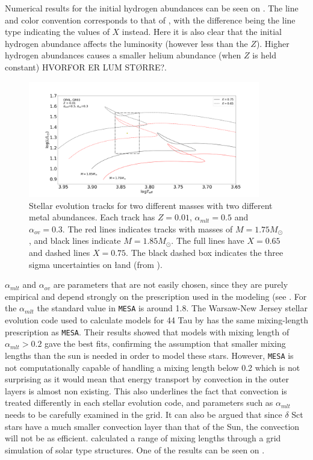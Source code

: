 Numerical results for the initial hydrogen abundances can be seen on . The line and color convention corresponds to that of , with the difference being the line type indicating the values of $X$ instead. Here it is also clear that the initial hydrogen abundance affects the luminosity (however less than the $Z$). Higher hydrogen abundances causes a smaller helium abundance (when $Z$ is held constant) HVORFOR ER LUM STØRRE?. 

\begin{figure}[htbp]
	\centering
	\includegraphics[width=0.9\textwidth]{test_x.png}
	\caption{Stellar evolution tracks for two different masses with two different metal abundances. Each track has $Z=0.01$, $\alpha_{mlt}=0.5$ and $\alpha_{ov}=0.3$. The red lines indicates tracks with masses of $M=1.75M_\odot$, and black lines indicate $M=1.85M_\odot$. The full lines have $X = 0.65$ and dashed lines $X = 0.75$. The black dashed box indicates the three sigma uncertainties on \l and \teff (from \citet{lenz2010delta}).}
	\label{diffx}
\end{figure}

 $\alpha_{mlt}$ and $\alpha_{ov}$ are parameters that are not easily chosen, since they are purely empirical and depend strongly on the prescription used in the modeling (see . For the $\alpha_{mlt}$ the standard value in \texttt{MESA} is around 1.8. The Warsaw-New Jersey stellar evolution code used to calculate models for 44 Tau by \citep{lenz2010delta} has the same mixing-length prescription as \texttt{MESA}. Their results showed that models with mixing length of $\alpha_{mlt} > 0.2$ gave the best fits, confirming the assumption that smaller mixing lengths than the sun is needed in order to model these stars. However, \texttt{MESA} is not computationally capable of handling a mixing length below 0.2 which is not surprising as it would mean that energy transport by convection in the outer layers is almost non existing. This also underlines the fact that convection is treated differently in each stellar evolution code, and parameters such as $\alpha_{mlt}$ needs to be carefully examined in the grid. It can also be argued that since $\delta$ Sct stars have a much smaller convection layer than that of the Sun, the convection will not be as efficient.  \citet{trampedach2011mass} calculated a range of mixing lengths through a grid simulation of solar type structures. One of the results can be seen on . 

